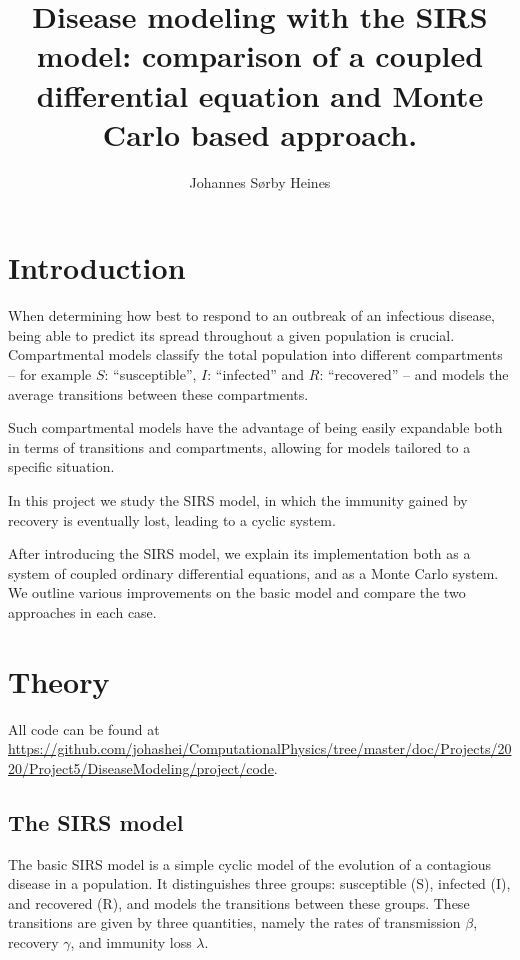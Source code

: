 \documentclass[a4paper,10pt,twocolumn]{article}
\title{Disease modeling with the SIRS model: comparison of a coupled differential equation and Monte Carlo based approach.}
\author{Johannes Sørby Heines}
\begin{document}

\section{Introduction}

When determining how best  to respond to an outbreak of an infectious disease, being able to predict its spread throughout a given population is crucial.
Compartmental models classify the total population into different compartments – for example $S$: ``susceptible'', $I$: ``infected'' and $R$: ``recovered'' – and models the average transitions between these compartments. 

Such compartmental models have the advantage of being easily expandable both in terms of transitions and compartments, allowing for models tailored to a specific situation.   


In this project we study the SIRS model, in which the immunity gained by recovery is eventually lost, leading to a cyclic system. 

 
After introducing the SIRS model, we explain its implementation both as a system of coupled ordinary differential equations, and as a Monte Carlo system. 
We outline various improvements on the basic model and compare the two approaches in each case.   

%
%
%
\section{Theory}

All code can be found at \url{https://github.com/johashei/ComputationalPhysics/tree/master/doc/Projects/2020/Project5/DiseaseModeling/project/code}.


\subsection{The SIRS model}
The basic SIRS model is a simple cyclic model of the evolution of a contagious disease in a population. It distinguishes three groups: susceptible (S), infected (I), and recovered (R), and models the transitions between these groups. 
These transitions are given by three quantities, namely the rates of transmission $\beta$, recovery $\gamma$, and immunity  loss $\lambda$. 
\end{document}
